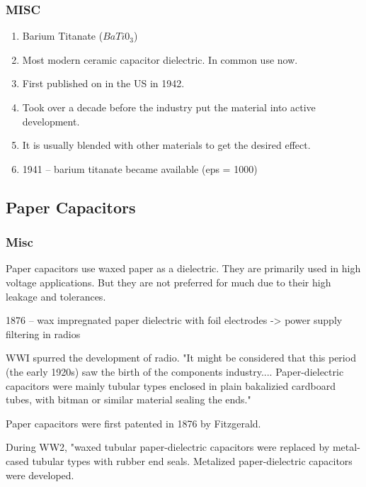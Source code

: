     \subsubsection{MISC}
        \begin{enumerate}
            \item Barium Titanate ($BaTi0_3$) \cite[Ch 3 Sec IV.C]{cerMaterials}
            \item Most modern ceramic capacitor dielectric. In common use now.
            \item First published on in the US in 1942.
            \item Took over a decade before the industry put the material into active development.
            \item It is usually blended with other materials to get the desired effect.
        \item 1941 -- barium titanate became available (eps = 1000) \cite{deis_hist}
        \end{enumerate}

\subsection{Paper Capacitors}
    \subsubsection{Misc}
        Paper capacitors use waxed paper as a dielectric. They are primarily used in high voltage applications. But they are not preferred for much due to their high leakage and tolerances.\cite{learn_caps}

        1876 -- wax impregnated paper dielectric with foil electrodes \cite{deis_hist}
        -> power supply filtering in radios

        WWI spurred the development of radio. "It might be considered that this period (the early 1920s) saw the birth of the components industry.... Paper-dielectric capacitors were mainly tubular types enclosed in plain bakalizied cardboard tubes, with bitman or similar material sealing the ends." \cite[ch3]{dumInv}

        Paper capacitors were first patented in 1876 by Fitzgerald. \cite[ch.~11]{dumInv}

        During WW2, "waxed tubular paper-dielectric capacitors were replaced by metal-cased tubular types with rubber end seals. Metalized paper-dielectric capacitors were developed. \cite[ch.~3]{dumInv}

